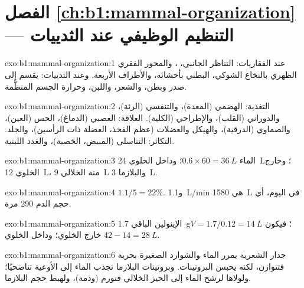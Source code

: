 \section*{الفصل \ref{ch:b1:mammal-organization} --- التنظيم الوظيفي عند الثدييات}

\begin{solution}{exo:b1:mammal-organization:1}
عند الفقاريات: التناظر الجانبي، ، والمحور الفقري
الظهري  بالنخاع الشوكي،  البطني بأحشائه، والأطراف
الأربعة. وعند الثدييات:  يقسم  إلى صدر وبطن،
والشعر، واللبن، وحرارة الجسم المنظَّمة.
\end{solution}

\begin{solution}{exo:b1:mammal-organization:2}
التغذية: الهضمي (المعدة)، والتنفسي (الرئة)، والدوراني (القلب)،
والإطراحي (الكلية). العلاقة: العصبي (الدماغ)،  الحس (العين)،
والصماوي (الدرقية)، والهيكل والعضلات (عظم الفخذ، العضلة ذات
الرأسين)، والجلد. التكاثر: التناسلي (المبيض، الخصية)، والغدد اللبنية.
\end{solution}

\begin{solution}{exo:b1:mammal-organization:3}
الماء $0.6\times 60 = \qty{36}{L}$؛ وداخل الخلوي \qty{24}{L}؛ وخارج
الخلوي \qty{12}{L}، منه الخلالي \qty{9}{L} والبلازما \qty{3}{L}.
\end{solution}

\begin{solution}{exo:b1:mammal-organization:4}
$1.1/5 = 22\%$. و\qty{1.1}{L/min} هي \qty{1580}{L} في اليوم، أي حجم
الدم 290 مرة.
\end{solution}

\begin{solution}{exo:b1:mammal-organization:5}
الإينولين الباقي \qty{1.7}{g}؛ فيكون $V = 1.7/0.12 = \qty{14}{L}$
خارج الخلوي؛ وداخل الخلوي $42 - 14 = \qty{28}{L}$.
\end{solution}

\begin{solution}{exo:b1:mammal-organization:6}
جدار الشعرية يمرر الماء والشوارد الصغيرة بحرية فتتوازن، لكنه يحبس
البروتينات. وبروتينات البلازما تجذب الماء إلى الأوعية تناضحيًا؛ ولولاها
لرشح الماء إلى الحيز الخلالي فتورم (وذمة)، ولهبط حجم البلازما.
\end{solution}

